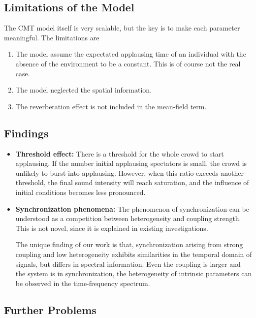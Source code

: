 \documentclass[UTF8,a4paper,11pt]{ctexart}
\begin{document}
\subsection{Limitations of the Model}

The CMT model itself is very scalable, but the key is to make each parameter meaningful. The limitations are
\begin{enumerate}
    \item The model assume the expectated applausing time of an individual with the absence of the environment to be a constant. This is of course not the real case.
    \item The model neglected the spatial information.
    \item The reverberation effect is not included in the mean-field term.
\end{enumerate}

\subsection{Findings}

\begin{itemize}
    \item \textbf{Threshold effect:} There is a threshold for the whole crowd to start applausing. If the number initial applausing spectators is small, the crowd is unlikely to burst into applausing. However, when this ratio exceeds another threshold, the final sound intensity will reach saturation, and the influence of initial conditions becomes less pronounced.
    \item \textbf{Synchronization phenomena:} The phenomenon of synchronization can be understood as a competition between heterogeneity and coupling strength. This is not novel, since it is explained in existing investigations.
    
    The unique finding of our work is that, synchronization arising from strong coupling and low heterogeneity exhibits similarities in the temporal domain of signals, but differs in spectral information. Even the coupling is larger and the system is in synchronization, the heterogeneity of intrinsic parameters can be observed in the time-frequency spectrum.
\end{itemize}

\subsection{Further Problems}
\end{document}
